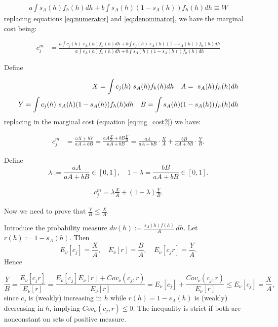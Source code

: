 \documentclass[12pt]{article}
\theoremstyle{plain}
\theoremstyle{plain}
\begin{document}
\begin{align}\label{eq:denominator}
    a \int s_A(h) f_h(h) dh +b \int s_A(h)    (1-s_A(h))  f_h(h) dh  \equiv W
\end{align}
replacing equations \ref{eq:numerator} and \ref{eq:denominator}, we have the marginal cost being: 

\begin{align}\label{eq:mg_cost2}
    c^m_j 
    &= \frac{a \int c_j(h)  \ s_A(h) f_h(h) dh +b \int c_j(h) \ s_A(h)    (1-s_A(h))  f_h(h) dh  }{a \int s_A(h) f_h(h) dh +b \int s_A(h)    (1-s_A(h))  f_h(h) dh }
\end{align}


Define

\begin{align}\label{eq:definitions}
X =   \int c_j(h)  \ s_A(h) f_h(h) dh \quad 
A =   \ s_A(h) f_h(h) dh \notag \\
Y =   \int c_j(h)  \ s_A(h) (1-s_A(h)) f_h(h) dh \quad 
B =   \int s_A(h) (1-s_A(h)) f_h(h) dh 
\end{align}
 replacing in the marginal cost (equation \ref{eq:mg_cost2}) we have: 

 \begin{align}\label{eq:37}
    c^m_j 
    &= \frac{a X +b Y }{aA + bB } = \frac{aA\frac{X}{A}+bB\frac{Y}{B}}{aA+bB} = \frac{aA}{aA+bB}\cdot\frac{X}{A} + \frac{bB}{aA+bB}\cdot\frac{Y}{B}.
\end{align}


Define
$$ \lambda := \frac{aA}{aA+bB} \in [0,1], \quad 1-\lambda = \frac{bB}{aA+bB} \in [0,1].$$

\begin{align}
    c^m_j = \lambda \frac{X}{A} + (1-\lambda)\frac{Y}{B}.
\end{align}

Now we need to prove that $\frac{Y}{B} \le \frac{X}{A}$. 

Introduce the probability measure $d\nu(h) := \frac{s_A(h)f(h)}{A}\,dh$.
Let $r(h) := 1-s_A(h)$. Then
$$E_{\nu}[c_j] = \frac{X}{A}, \quad E_{\nu}[r] = \frac{B}{A}, \quad E_{\nu}[c_j r] = \frac{Y}{A}.$$
Hence
 
$$ \frac{Y}{B} = \frac{E_{\nu}[c_j r]}{E_{\nu}[r]} = \frac{E_{\nu}[c_j]E_{\nu}[r] + Cov_{\nu}(c_j,r)}{E_{\nu}[r]} = E_{\nu}[c_j] + \frac{Cov_{\nu}(c_j,r)}{E_{\nu}[r]} \le E_{\nu}[c_j] = \frac{X}{A},$$
since $c_j$ is (weakly) increasing in $h$ while $r(h)=1-s_A(h)$ is (weakly) decreasing in $h$, implying $Cov_{\nu}(c_j,r) \le 0$. The inequality is strict if both are nonconstant on sets of positive measure.
\end{document}
